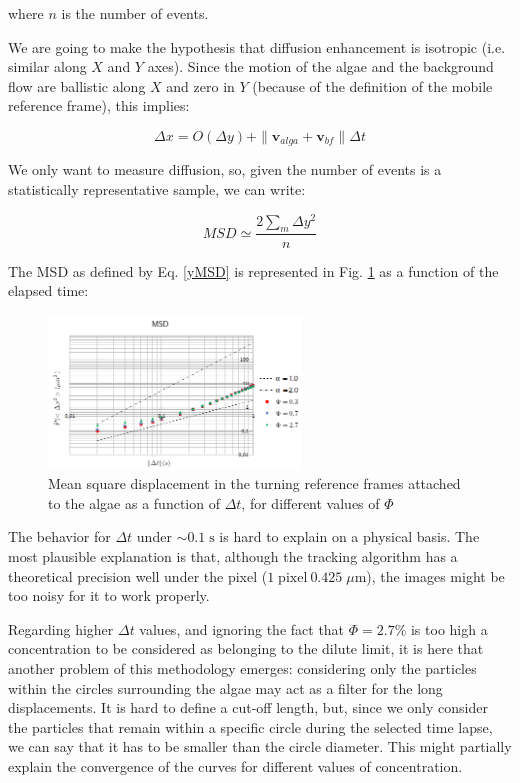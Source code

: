 where $n$ is the number of events. 

We are going to make the hypothesis that diffusion enhancement is isotropic (i.e. similar along $X$ and $Y$ axes). Since the motion of the algae and the background flow are ballistic along $X$ and zero in $Y$ (because of the definition of the mobile reference frame), this implies:

\begin{equation}
\Delta x = O(\Delta y) + \| \mathbf{v}_{alga} + \mathbf{v}_{bf} \| \Delta t
\end{equation}

We only want to measure diffusion, so, given the number of events is a statistically representative sample, we can write:

\begin{equation}
MSD \simeq \frac{2 \displaystyle\sum_{m} \Delta y^{2}}{n}
\label{yMSD}
\end{equation}

The MSD as defined by Eq. \ref{yMSD} is represented in Fig. \ref{MSD_e3} as a function of the elapsed time:

\begin{figure}[H]
	\centering
	\includegraphics[width=0.6\textwidth]{archivos/MSD_e3.png}
	\caption{Mean square displacement in the turning reference frames attached to the algae as a function of $\Delta t$, for different values of $\Phi$}
	\label{MSD_e3}
\end{figure}

The behavior for $\Delta t$ under $\sim 0.1 \; \textrm{s}$ is hard to explain on a physical basis. The most plausible explanation is that, although the tracking algorithm has a theoretical precision well under the pixel ($1 \; \textrm{pixel} ~ 0.425 \; \mu \textrm{m}$), the images might be too noisy for it to work properly.

Regarding higher $\Delta t$ values, and ignoring the fact that $\Phi = 2.7\%$ is too high a concentration to be considered as belonging to the dilute limit, it is here that another problem of this methodology emerges: considering only the particles within the circles surrounding the algae may act as a filter for the long displacements. It is hard to define a cut-off length, but, since we only consider the particles that remain within a specific circle during the selected time lapse, we can say that it has to be smaller than the circle diameter. This might partially explain the convergence of the curves for different values of concentration.

